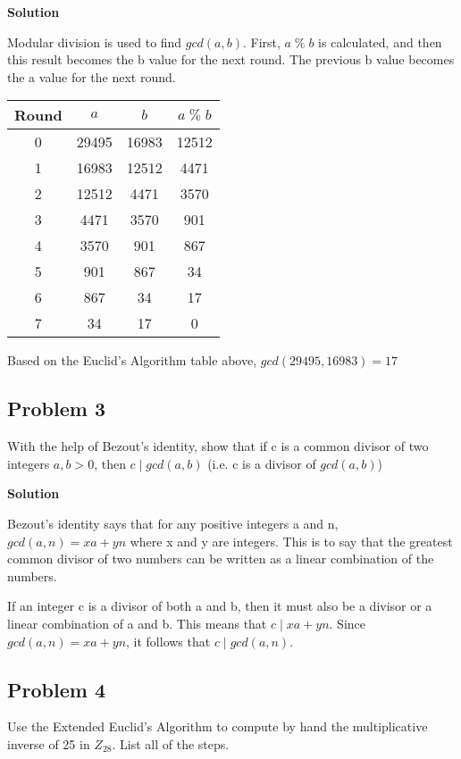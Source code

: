 \documentclass[11pt]{article}
\begin{document}
\textbf{Solution}

Modular division is used to find $gcd(a,b)$. First, $a\; \%\; b$ is calculated, and then this result becomes the b value for the next round. The previous b value becomes the a value for the next round.
\begin{center}
\begin{tabular}{|c|c|c|c|}
\hline 
Round & $a$ & $b$ & $a\; \%\; b$ \\ 
\hline 
0 & 29495 & 16983 & 12512 \\ 
\hline 
1 & 16983 & 12512 & 4471 \\ 
\hline 
2 & 12512 & 4471 & 3570 \\ 
\hline 
3 & 4471 & 3570 & 901 \\ 
\hline 
4 & 3570 & 901 & 867 \\ 
\hline 
5 & 901 & 867 & 34 \\ 
\hline 
6 & 867 & 34 & 17 \\ 
\hline 
7 & 34 & 17 & 0 \\ 
\hline 
\end{tabular}
\end{center}
Based on the Euclid's Algorithm table above, $gcd(29495, 16983) = 17$

\pagebreak

\subsection{Problem 3}
With the help of Bezout's identity, show that if c is a common divisor of two integers $a, b > 0$, then $c\; |\; gcd(a,b)$ (i.e. c is a divisor of $gcd(a,b)$)

\textbf{Solution}

Bezout's identity says that for any positive integers a and n, $gcd(a,n) = xa + yn$ where x and y are integers. This is to say that the greatest common divisor of two numbers can be written as a linear combination of the numbers.

If an integer c is a divisor of both a and b, then it must also be a divisor or a linear combination of a and b. This means that $c\; |\; xa + yn$. Since $gcd(a,n) = xa + yn$, it follows that $c\; |\; gcd(a,n)$.

\subsection{Problem 4}
Use the Extended Euclid's Algorithm to compute by hand the multiplicative inverse of 25 in $Z_{28}$. List all of the steps.
\end{document}
